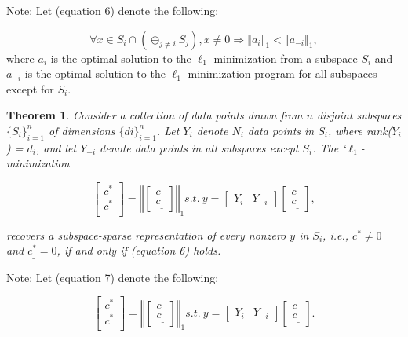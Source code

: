 \documentclass{article}
\newtheorem{theorem}{Theorem}[section]
\begin{document}
Note: Let (equation 6) denote the following: 

\[\forall x \in S_i \cap(\oplus_{j \neq i} S_j), x \neq 0 \Rightarrow \left\Vert a_i \right\Vert_1 < \left\Vert a_{-i} \right\Vert_1,
\]
where $a_i$ is the optimal solution to the $\ell_1$-minimization from a subspace $S_i$ and $a_{-i}$ is the optimal solution to the $\ell_1$-minimization program for all subspaces except for $S_i$. 

\begin{theorem}
Consider a collection of data points drawn from $n$ disjoint subspaces $\{S_i\}_{i=1}^n$ of dimensions $\{di\}_{i=1}^n$. Let $Y_i$ denote $N_i$ data points in $S_i$, where rank($Y_i$) = $d_i$, and let $Y_{−i}$
denote data points in all subspaces except $S_i$. The `$\ell_1$-minimization

\[\begin{bmatrix} c^* \\ c^*_\_ \end{bmatrix} =
 \left\Vert \begin{bmatrix} c \\ c_\_ \end{bmatrix} \right\Vert_1 s.t. \  y = \begin{bmatrix} Y_i & Y_{-i} \end{bmatrix} \begin{bmatrix} c \\ c_\_ \end{bmatrix},\]
 
recovers a subspace-sparse representation of every nonzero $y$ in
$S_i$, i.e., $c^* \neq 0$ and $c^*_\_ = 0$, if and only if (equation 6) holds. \cite{elhamifar2012sparse}

\end{theorem}

Note: Let (equation 7) denote the following:

\[\begin{bmatrix} c^* \\ c^*_\_ \end{bmatrix} =
 \left\Vert \begin{bmatrix} c \\ c_\_ \end{bmatrix} \right\Vert_1 s.t. \  y = \begin{bmatrix} Y_i & Y_{-i} \end{bmatrix} \begin{bmatrix} c \\ c_\_ \end{bmatrix}.\]
\end{document}
